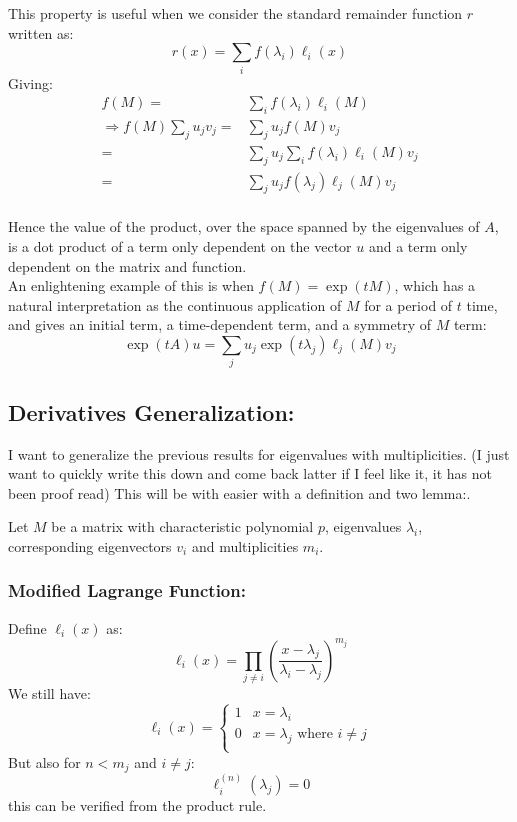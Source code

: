 This property is useful when we consider the standard remainder function $r$ written as:
\[r(x) = \sum_if(\lambda_i)\ell_i(x)\]
Giving:
\begin{equation*}
\begin{aligned}
	f(M) =& \sum_if(\lambda_i)\ell_i(M)\\
	\Rightarrow f(M)\sum_ju_jv_j =& \sum_ju_jf(M)v_j \\
	=& \sum_ju_j\sum_if(\lambda_i)\ell_i(M)v_j\\
	=& \sum_ju_jf(\lambda_j)\ell_j(M)v_j\\
\end{aligned}
\end{equation*}

Hence the value of the product,
over the space spanned by the eigenvalues of $A$,
is a dot product of a term only dependent on the vector $u$ and a term only dependent on the matrix and function.
\\

An enlightening example of this is when $f(M)=\exp(tM)$,
which has a natural interpretation as the continuous application of $M$ for a period of $t$ time,
and gives an initial term,
a time-dependent term,
and a symmetry of $M$ term:
\[\exp(tA)u = \sum_ju_j\exp(t\lambda_j)\ell_j(M)v_j\]

\subsection{Derivatives Generalization:}
I want to generalize the previous results for eigenvalues with multiplicities.
(I just want to quickly write this down and come back latter if I feel like it,
it has not been proof read)
This will be with easier with a definition and two lemma:.

Let $M$ be a matrix with characteristic polynomial $p$, eigenvalues $\lambda_i$, corresponding eigenvectors $v_i$ and multiplicities $m_i$.
\subsubsection{Modified Lagrange Function:}
Define $\ell_i(x)$ as:
\[\ell_i(x)=\prod_{j\neq i}\left(\frac{x-\lambda_j}{\lambda_i-\lambda_j}\right)^{m_j}\]
We still have:
\[\ell_i(x) = \begin{cases} 1&x=\lambda_i\\0&x=\lambda_j \text{ where } i\neq j\\\end{cases}\]
But also for $n < m_j$ and $i\neq j$:
\[\ell_i^{(n)}(\lambda_j) = 0\]
this can be verified from the product rule.

